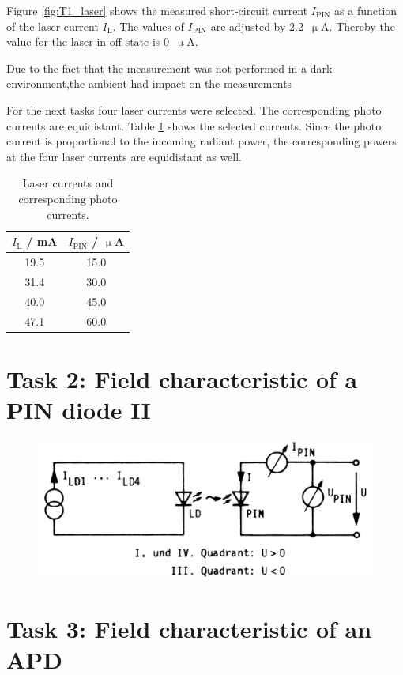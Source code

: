 Figure \ref{fig:T1_laser} shows the measured short-circuit current $I_{\mathrm{PIN}}$ as a function of the laser current $I_{\mathrm{L}}$. The values of $I_{\mathrm{PIN}}$ are adjusted by 2.2~$\upmu$A. Thereby the value for the laser in off-state is 0~$\upmu$A.

Due to the fact that the measurement was not performed in a dark environment,the ambient had impact on the measurements 

For the next tasks four laser currents were selected. The corresponding photo currents are equidistant. Table \ref{tab:T1_values} shows the selected currents. Since the photo current is proportional to the incoming radiant power, the corresponding powers at the four laser currents are equidistant as well.


\begin{table}%
\centering
\caption{Laser currents and corresponding photo currents.}

\begin{tabular}{cc}

\toprule
$I_{\mathrm{L}}$ / mA	&	$I_{\mathrm{PIN}}$ / $\upmu$A\\

\midrule

19.5&15.0\\
31.4&30.0\\
40.0&45.0\\
47.1&60.0\\
\bottomrule 
\end{tabular}
\label{tab:T1_values}
\end{table}

\section{Task 2: Field characteristic of a PIN diode II}

\begin{figure}%
\centering
\includegraphics[width=.6\columnwidth]{Grafiken/T2_setup.jpg}%
\caption{}%
\label{fig:T3_setup}%
\end{figure}

\section{Task 3: Field characteristic of an APD}

